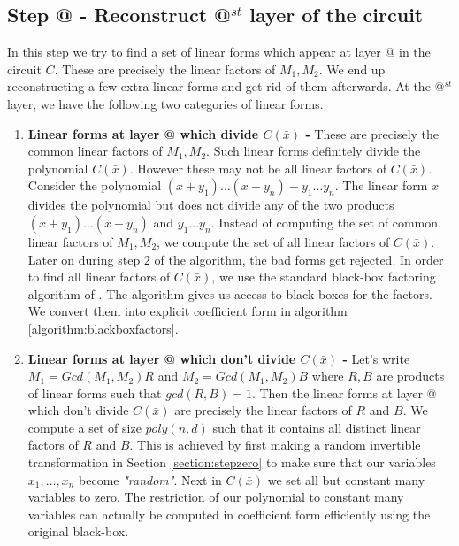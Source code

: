 \documentclass[12pt]{caltech_thesis}
\makeatletter
\theoremstyle{plain}
\theoremstyle{definition}
\newcommand{\B}[1]{\bar{#1}}
\newcommand*{\rom}[1]{\expandafter\@slowromancap\romannumeral #1@}
\makeatother
\begin{document}
\subsection{Step \rom{1} - Reconstruct \rom{1}$^{st}$ layer of the circuit}
In this step we try to find a set of linear forms which appear at layer \rom{1} in the circuit $C$. 
These are precisely the linear factors of $M_1,M_2$. We end up reconstructing 
a few extra linear forms and get rid of them afterwards.  At the \rom{1}$^{st}$ layer, we have the following two categories
of linear forms.
\begin{enumerate}
 \item \textbf{Linear forms at layer \rom{1} which divide $C(\B{x})$ - } These are precisely the common linear factors of $M_1,M_2$. 
 Such linear forms definitely
 divide the polynomial $C(\B{x})$.  However these may not be all linear factors of $C(\B{x})$. Consider the polynomial $(x+y_1)\ldots(x+y_n) - y_1\ldots y_n$.
 The linear form $x$ divides the polynomial but does not divide any of the two products $(x+y_1)\ldots(x+y_n)$ and $y_1\ldots y_n$. 
 Instead of computing the set of common linear factors of $M_1,M_2$, we compute the set of all linear factors of $C(\B{x})$. Later on
 during step $2$ of the algorithm, the bad forms get rejected. In order to find all linear factors of $C(\B{x})$, we use the standard black-box factoring
 algorithm of \cite{KalTr90}. The algorithm gives us access to black-boxes for the factors. We convert them into explicit coefficient form
 in algorithm \ref{algorithm:blackboxfactors}.
 
 \item \textbf{Linear forms at layer \rom{1} which don't divide $C(\B{x})$ - } Let's write $M_1 = Gcd(M_1,M_2) R$ and $M_2 = Gcd(M_1,M_2)B$ where $R,B$
 are products of linear forms such that $gcd(R,B)=1$.
 Then the linear forms at layer \rom{1} which don't divide $C(\B{x})$ are precisely the linear factors of $R$ and $B$. 
 We compute a set of size $poly(n,d)$
 such that it contains all distinct linear factors of $R$ and $B$. This is achieved by first making a random invertible transformation in Section
 \ref{section:stepzero} to make sure that our variables $x_1,\ldots,x_n$ become \emph{"random"}. Next in $C(\B{x})$ we set all but 
 constant many variables to zero. The restriction of our polynomial to constant many variables can actually be computed in coefficient 
 form efficiently using the original black-box. 
 

\end{enumerate}
\end{document}
